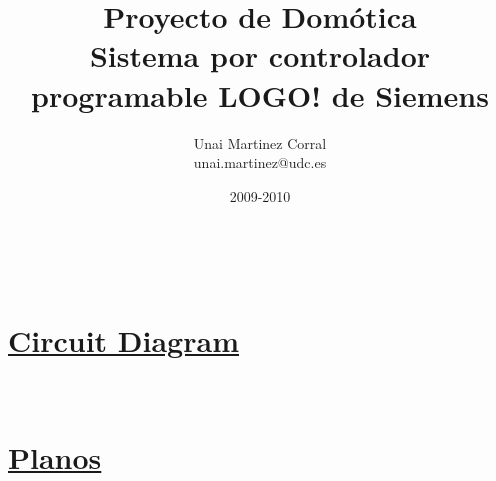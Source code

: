\documentclass[a4paper,titlepage,10pt,oneside]{article}
\title{ %
\Huge{\textbf{Proyecto de Dom\'otica}} \\
\vspace{0.5cm}
\Large{Sistema por controlador programable LOGO! de Siemens}
}
\author{ %
\Large{Unai Martinez Corral} \\
\small{unai.martinez@udc.es}}
\date{2009-2010} %
\begin{document}
\maketitle %

\tableofcontents %



\newpage


\newpage


\newpage


\newpage




\newpage
\fancyfoot[C]{} %

\begin{center}
 \textcolor{White}{.} \\
 \vspace{9cm}
 \section*{\Huge{\textbf{\underline{Circuit Diagram}}}}\label{CircuitDiagram} %
\end{center}


\newpage
\fancyfoot[C]{} %

\begin{center}
 \textcolor{White}{.} \\
 \vspace{9cm}
 \section*{\Huge{\textbf{\underline{Planos}}}}\label{Planos} %
\end{center}
\end{document}
